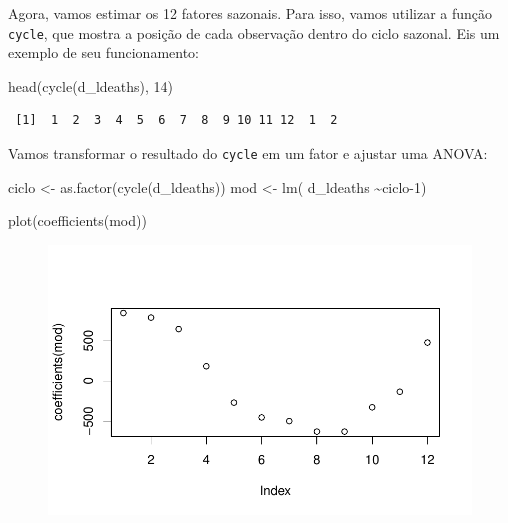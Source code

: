 \documentclass[
  letterpaper,
  DIV=11,
  numbers=noendperiod]{scrreprt}
\newenvironment{Shaded}{\begin{snugshade}}{\end{snugshade}}
\newcommand{\DecValTok}[1]{\textcolor[rgb]{0.68,0.00,0.00}{#1}}
\newcommand{\FunctionTok}[1]{\textcolor[rgb]{0.28,0.35,0.67}{#1}}
\newcommand{\NormalTok}[1]{\textcolor[rgb]{0.00,0.23,0.31}{#1}}
\newcommand{\OtherTok}[1]{\textcolor[rgb]{0.00,0.23,0.31}{#1}}
\newcommand{\SpecialCharTok}[1]{\textcolor[rgb]{0.37,0.37,0.37}{#1}}
\begin{document}
Agora, vamos estimar os 12 fatores sazonais. Para isso, vamos utilizar a
função \texttt{cycle}, que mostra a posição de cada observação dentro do
ciclo sazonal. Eis um exemplo de seu funcionamento:

\begin{Shaded}
\begin{Highlighting}[]
\FunctionTok{head}\NormalTok{(}\FunctionTok{cycle}\NormalTok{(d\_ldeaths), }\DecValTok{14}\NormalTok{)}
\end{Highlighting}
\end{Shaded}

\begin{verbatim}
 [1]  1  2  3  4  5  6  7  8  9 10 11 12  1  2
\end{verbatim}

Vamos transformar o resultado do \texttt{cycle} em um fator e ajustar
uma ANOVA:

\begin{Shaded}
\begin{Highlighting}[]
\NormalTok{ciclo }\OtherTok{\textless{}{-}} \FunctionTok{as.factor}\NormalTok{(}\FunctionTok{cycle}\NormalTok{(d\_ldeaths))}
\NormalTok{mod }\OtherTok{\textless{}{-}} \FunctionTok{lm}\NormalTok{( d\_ldeaths }\SpecialCharTok{\textasciitilde{}}\NormalTok{ciclo}\DecValTok{{-}1}\NormalTok{)}

\FunctionTok{plot}\NormalTok{(}\FunctionTok{coefficients}\NormalTok{(mod))}
\end{Highlighting}
\end{Shaded}

\begin{figure}[H]

{\centering \includegraphics{ferramentas_files/figure-pdf/unnamed-chunk-21-1.pdf}

}

\end{figure}
\end{document}
